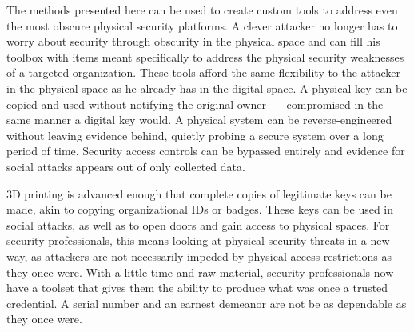 \documentclass{acm_proc_article-sp}
\begin{document}
The methods presented here can be used to create custom tools to address even the most obscure physical security platforms. A clever attacker no longer has to worry about security through obscurity in the physical space and can fill his toolbox with items meant specifically to address the physical security weaknesses of a targeted organization. These tools afford the same flexibility to the attacker in the physical space as he already has in the digital space. A physical key can be copied and used without notifying the original owner~--- compromised in the same manner a digital key would. A physical system can be reverse-engineered without leaving evidence behind, quietly probing a secure system over a long period of time. Security access controls can be bypassed entirely and evidence for social attacks appears out of only collected data.

3D printing is advanced enough that complete copies of legitimate keys can be made, akin to copying organizational IDs or badges. These keys can be used in social attacks, as well as to open doors and gain access to physical spaces. For security professionals, this means looking at physical security threats in a new way, as attackers are not necessarily impeded by physical access restrictions as they once were. With a little time and raw material, security professionals now have a toolset that gives them the ability to produce what was once a trusted credential. A serial number and an earnest demeanor are not be as dependable as they once were.



\nocite{*}
\balancecolumns
\end{document}
